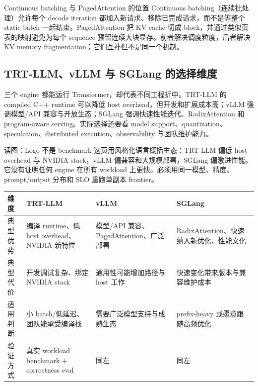\begin{importantbox}{Continuous batching 与 PagedAttention 的位置}
Continuous batching（连续批处理）允许每个 decode iteration 都加入新请求、移除已完成请求，而不是等整个 static batch 一起结束。PagedAttention 把 KV cache 切成 block，并通过类似页表的映射避免为每个 sequence 预留连续大块显存。前者解决调度粒度，后者解决 KV memory fragmentation；它们互补但不是同一个机制。
\end{importantbox}

\subsection{TRT-LLM、vLLM 与 SGLang 的选择维度}

三个 engine 都能运行 Transformer，却代表不同工程折中。TRT-LLM 的 compiled C++ runtime 可以降低 host overhead，但开发和扩展成本高；vLLM 强调模型/API 兼容与开放生态；SGLang 强调快速性能迭代、RadixAttention 和 program-aware serving。实际选择还要看 model support、quantization、speculation、distributed execution、observability 与团队维护能力。


\begin{knowledgebox}{读图：Logo 不是 benchmark}
这页用风格化语言概括生态：TRT-LLM 偏低 host overhead 与 NVIDIA stack，vLLM 偏兼容和大规模部署，SGLang 偏激进性能。它没有证明任何 engine 在所有 workload 上更快。必须用同一模型、精度、prompt/output 分布和 SLO 重跑单副本 frontier。
\end{knowledgebox}


\begin{center}
\small
\begin{tabularx}{\textwidth}{L{2.4cm}YYY}
\toprule
维度 & TRT-LLM & vLLM & SGLang \\
\midrule
典型优势 & 编译 runtime、低 host overhead、NVIDIA 新特性 & 模型/API 兼容、PagedAttention、广泛部署 & RadixAttention、快速纳入新优化、性能文化 \\
典型代价 & 开发调试复杂、绑定 NVIDIA stack & 通用性可能增加路径与 host 工作 & 快速变化带来版本与兼容维护成本 \\
适用判断 & 小 batch/低延迟、团队能承受编译栈 & 需要广泛模型支持与成熟生态 & prefix-heavy 或愿意跟随高频优化 \\
验证方式 & 真实 workload benchmark + correctness eval & 同左 & 同左 \\
\bottomrule
\end{tabularx}
\end{center}

